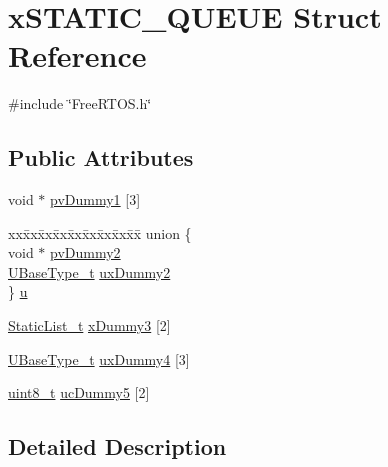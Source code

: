 \hypertarget{structxSTATIC__QUEUE}{}\section{x\+S\+T\+A\+T\+I\+C\+\_\+\+Q\+U\+E\+UE Struct Reference}
\label{structxSTATIC__QUEUE}


{\ttfamily \#include \char`\"{}Free\+R\+T\+O\+S.\+h\char`\"{}}

\subsection*{Public Attributes}
\begin{DoxyCompactItemize}
\item 
void $\ast$ \hyperlink{structxSTATIC__QUEUE_aacf22a66a8d723648995692ec77ee416}{pv\+Dummy1} \mbox{[}3\mbox{]}
\item 
\begin{tabbing}
xx\=xx\=xx\=xx\=xx\=xx\=xx\=xx\=xx\=\kill
union \{\\
\>void $\ast$ \hyperlink{structxSTATIC__QUEUE_adb72a02b22a558f6fad381d65af5ac68}{pvDummy2}\\
\>\hyperlink{pic32mx_2portmacro_8h_a646f89d4298e4f5afd522202b11cb2e6}{UBaseType\_t} \hyperlink{structxSTATIC__QUEUE_ab4e6a2a0bb59ba54d05927e99afd553f}{uxDummy2}\\
\} \hyperlink{structxSTATIC__QUEUE_a78586d9713919772b3aa586702eec0ab}{u}\\

\end{tabbing}\item 
\hyperlink{FreeRTOS_8h_a9735ad9101a2bd25f83a62089a4acee6}{Static\+List\+\_\+t} \hyperlink{structxSTATIC__QUEUE_add0de93e08b632124122850bcd543597}{x\+Dummy3} \mbox{[}2\mbox{]}
\item 
\hyperlink{pic32mx_2portmacro_8h_a646f89d4298e4f5afd522202b11cb2e6}{U\+Base\+Type\+\_\+t} \hyperlink{structxSTATIC__QUEUE_a502854697731754ce445f6503d14b127}{ux\+Dummy4} \mbox{[}3\mbox{]}
\item 
\hyperlink{stdint_8h_aba7bc1797add20fe3efdf37ced1182c5}{uint8\+\_\+t} \hyperlink{structxSTATIC__QUEUE_a541c5044376603540cc3c9cabcbdc5e6}{uc\+Dummy5} \mbox{[}2\mbox{]}
\end{DoxyCompactItemize}


\subsection{Detailed Description}


